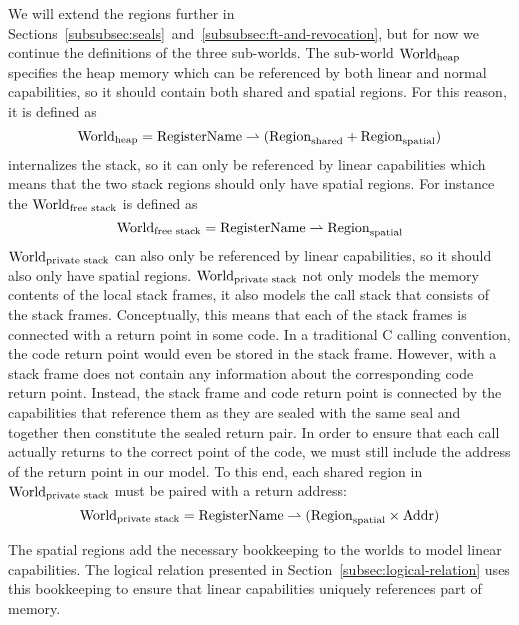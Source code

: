 \begin{jversion}
We will extend the regions further in Sections~\ref{subsubsec:seals}~and~\ref{subsubsec:ft-and-revocation}, but for now we continue the definitions of the three sub-worlds.
The sub-world $\mathrm{World}_\mathrm{heap}$ specifies the heap memory which can be referenced by both linear and normal capabilities, so it should contain both shared and spatial regions.
For this reason, it is defined as
\[
  \mathrm{World}_\mathrm{heap} = \mathrm{RegisterName} \rightharpoonup (\mathrm{Region}_\mathrm{shared} + \mathrm{Region}_\mathrm{spatial})
\]
\srccm{} internalizes the \stktokens{} stack, so it can only be referenced by linear capabilities which means that the two stack regions should only have spatial regions.
For instance the $\mathrm{World}_\text{free stack}$ is defined as
\[
  \mathrm{World}_\text{free stack} = \mathrm{RegisterName} \rightharpoonup \mathrm{Region}_\mathrm{spatial}
\]
$\mathrm{World}_\text{private stack}$ can also only be referenced by linear capabilities, so it should also only have spatial regions.
$\mathrm{World}_\text{private stack}$ not only models the memory contents of the local stack frames, it also models the call stack that consists of the stack frames.
Conceptually, this means that each of the stack frames is connected with a return point in some code.
In a traditional C calling convention, the code return point would even be stored in the stack frame.
However, with \stktokens{} a stack frame does not contain any information about the corresponding code return point.
Instead, the stack frame and code return point is connected by the capabilities that reference them as they are sealed with the same seal and together then constitute the sealed return pair.
In order to ensure that each call actually returns to the correct point of the code, we must still include the address of the return point in our model.
To this end, each shared region in $\mathrm{World}_\text{private stack}$ must be paired with a return address:
\[
\mathrm{World}_\text{private stack} = \mathrm{RegisterName} \rightharpoonup (\mathrm{Region}_\mathrm{spatial} \times \mathrm{Addr})
\]

The spatial regions add the necessary bookkeeping to the worlds to model linear capabilities.
The logical relation presented in Section~\ref{subsec:logical-relation} uses this bookkeeping to ensure that linear capabilities uniquely references part of memory.


\end{jversion}
